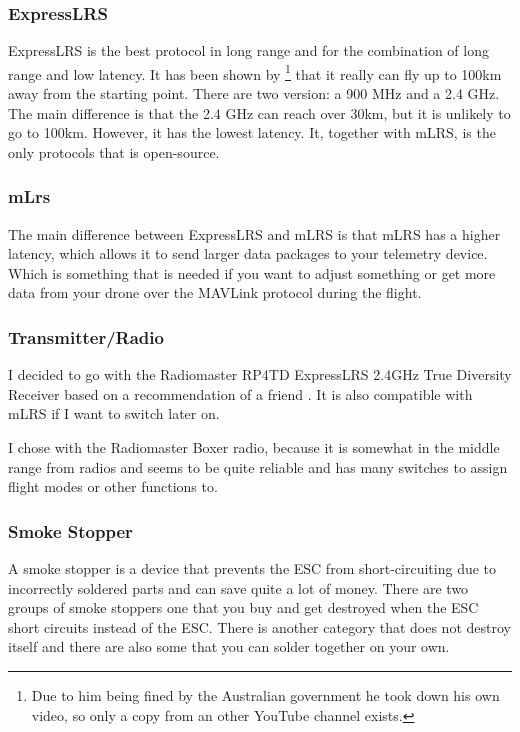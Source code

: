 \documentclass[svgnames]{article}
\begin{document}
	\subsubsection*{ExpressLRS}
	ExpressLRS is the best protocol in long range and for the combination of long range and low latency. It has been shown by \textcite{elrswezley}\footnote{Due to him being fined by the Australian government he took down his own video, so only a copy from an other YouTube channel exists.} that it really can fly up to 100km away from the starting point. There are two version: a 900 MHz and a 2.4 GHz. The main difference is that the 2.4 GHz can reach over 30km, but it is unlikely to go to 100km. However, it has the lowest latency. It, together with mLRS, is the only protocols that is open-source.
	\subsubsection*{mLrs}
	The main difference between ExpressLRS and mLRS is that mLRS has a higher latency, which allows it to send larger data packages to your telemetry device. Which is something that is needed if you want to adjust something or get more data from your drone over the MAVLink protocol during the flight. 
	
	\subsubsection*{Transmitter/Radio}
	I decided to go with the Radiomaster RP4TD ExpressLRS 2.4GHz True Diversity Receiver based on a recommendation of a friend \cite{radiomasterreceiver}. It is also compatible with mLRS if I want to switch later on.
	
	I chose with the Radiomaster Boxer\cite{radiomasterboxer} radio, because it is somewhat in the middle range from radios and seems to be quite reliable and has many switches to assign flight modes or other functions to. 

	\subsubsection{Smoke Stopper}
	A smoke stopper is a device that prevents the ESC from short-circuiting due to incorrectly soldered parts and can save quite a lot of money. There are two groups of smoke stoppers one that you buy and get destroyed when the ESC short circuits instead of the ESC. There is another category that does not destroy itself and there are also some that you can solder together on your own\cite{smokestopper}. 
	
\end{document}
